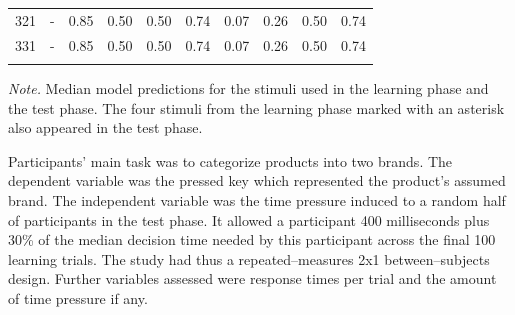 \documentclass[a4paper,man,natbib]{apa6}
\begin{document}
\begin{table}
\begin{center}
\begin{threeparttable}
\begin{tabular}{cccccccccc}
321 & - & 0.85 & 0.50 & 0.50 & 0.74 & 0.07 & 0.26 & 0.50 & 0.74\\
331 & - & 0.85 & 0.50 & 0.50 & 0.74 & 0.07 & 0.26 & 0.50 & 0.74\\
\bottomrule
\addlinespace
\end{tabular}
\begin{tablenotes}[para]
\textit{Note.} Median model predictions for the stimuli used in the learning phase and the test phase. The four stimuli from the learning phase marked with an asterisk also appeared in the test phase.
\end{tablenotes}
\end{threeparttable}
\end{center}
\end{table}

Participants' main task was to categorize products into two brands. The dependent variable was the pressed key which represented the product's assumed brand. The independent variable was the time pressure induced to a random half of participants in the test phase. It allowed a participant 400 milliseconds plus 30\% of the median decision time needed by this participant across the final 100 learning trials. The study had thus a repeated--measures 2x1 between--subjects design. Further variables assessed were response times per trial and the amount of time pressure if any.
\end{document}
